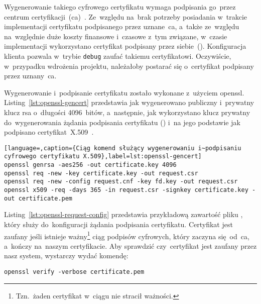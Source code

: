 \documentclass[thesis]{subfiles}
\begin{document}
Wygenerowanie takiego cyfrowego certyfikatu wymaga podpisania go~przez centrum certyfikacji~(\gls{ca})~\cite{wiki:ca}. Ze~względu na~brak potrzeby posiadania w~trakcie implementacji certyfikatu podpisanego przez uznane~\gls{ca}, a~także ze~względu na~względnie duże koszty finansowe i~czasowe z~tym związane, w~czasie implementacji wykorzystano certyfikat podpisany przez siebie~(). Konfiguracja klienta pozwala w~trybie \texttt{debug} zaufać takiemu certyfikatowi. Oczywiście, w~przypadku wdrożenia projektu, należałoby postarać się o~certyfikat podpisany przez uznany~\gls{ca}.

Wygenerowanie i~podpisanie certyfikatu zostało wykonane z~użyciem \gls{openssl}. Listing~\ref{lst:openssl-gencert} przedstawia jak wygenerowano publiczny i~prywatny klucz \gls{rsa} o~długości 4096~bitów, a~następnie, jak wykorzystano klucz prywatny do~wygenerowania żądania podpisania certyfikatu () i~na jego podstawie jak podpisano certyfikat~X.509~\cite{openssl-cookbook,wiki:csr}.

\begin{minipage}{\linewidth} %
\begin{lstlisting}[language=,caption={Ciąg komend służący wygenerowaniu i~podpisaniu cyfrowego certyfikatu X.509},label=lst:openssl-gencert]
openssl genrsa -aes256 -out certificate.key 4096
openssl req -new -key certificate.key -out request.csr
openssl req -new -config request.cnf -key fd.key -out request.csr
openssl x509 -req -days 365 -in request.csr -signkey certificate.key -out certificate.pem
\end{lstlisting}
\end{minipage}

Listing~\ref{lst:openssl-request-config} przedstawia przykładową zawartość pliku , który służy do~konfiguracji żądania podpisania certyfikatu. Certyfikat jest zaufany jeśli istnieje ważny\footnote{Tzn.~żaden certyfikat w~ciągu nie stracił ważności.} ciąg podpisów cyfrowych, który zaczyna się~od~\gls{ca}, a~kończy na~naszym certyfikacie. Aby sprawdzić czy~certyfikat jest zaufany przez nasz system, wystarczy wydać komendę:\mynobreakpar

\begin{center}
	\texttt{openssl verify -verbose certificate.pem}
\end{center}
\end{document}
